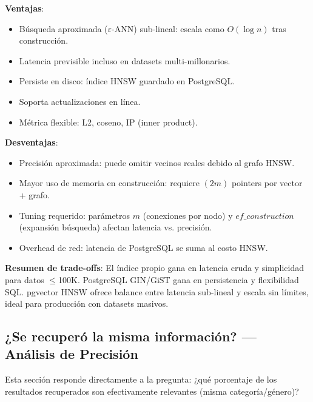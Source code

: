 \documentclass[12pt,a4paper]{article}
\begin{document}
\begin{description}[leftmargin=2cm, style=nextline]
  \item[pgvector HNSW (imagen/audio)]
    \textbf{Ventajas}:
    \begin{itemize}[leftmargin=1cm]
      \item Búsqueda aproximada ($\varepsilon$-ANN) sub-lineal: escala como $O(\log n)$ tras construcción.
      \item Latencia previsible incluso en datasets multi-millonarios.
      \item Persiste en disco: índice HNSW guardado en PostgreSQL.
      \item Soporta actualizaciones en línea.
      \item Métrica flexible: L2, coseno, IP (inner product).
    \end{itemize}
    \textbf{Desventajas}:
    \begin{itemize}[leftmargin=1cm]
      \item Precisión aproximada: puede omitir vecinos reales debido al grafo HNSW.
      \item Mayor uso de memoria en construcción: requiere $(2m)$ pointers por vector + grafo.
      \item Tuning requerido: parámetros $m$ (conexiones por nodo) y $ef\_construction$ (expansión búsqueda)
            afectan latencia vs. precisión.
      \item Overhead de red: latencia de PostgreSQL se suma al costo HNSW.
    \end{itemize}
\end{description}

\noindent
\textbf{Resumen de trade-offs}:
El índice propio gana en latencia cruda y simplicidad para datos $\leq$100K.
PostgreSQL GIN/GiST gana en persistencia y flexibilidad SQL.
pgvector HNSW ofrece balance entre latencia sub-lineal y escala sin límites,
ideal para producción con datasets masivos.

\subsection{¿Se recuperó la misma información? — Análisis de Precisión}

Esta sección responde directamente a la pregunta: ¿qué porcentaje de los resultados
recuperados son efectivamente relevantes (misma categoría/género)?
\end{document}
